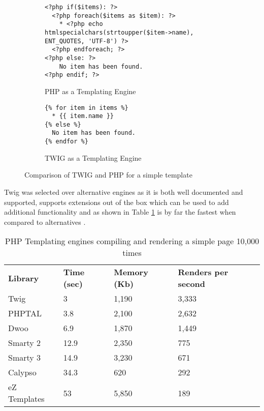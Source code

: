 \begin{figure}
\centering

\begin{subfigure}[a]{\textwidth}
\centering
\begin{lstlisting}[style=phpcolor]
<?php if($items): ?>
  <?php foreach($items as $item): ?>
    * <?php echo htmlspecialchars(strtoupper($item->name), ENT_QUOTES, 'UTF-8') ?>
  <?php endforeach; ?>
<?php else: ?>
    No item has been found.
<?php endif; ?>
\end{lstlisting}
\caption{PHP as a Templating Engine}
\end{subfigure}

\begin{subfigure}[b]{\textwidth}
\centering
\begin{lstlisting}[style=phpcolor,language=twig]
{% for item in items %}
  * {{ item.name }}
{% else %}
  No item has been found.
{% endfor %}
\end{lstlisting}
\caption{TWIG as a Templating Engine}
\end{subfigure}

\caption{Comparison of TWIG and PHP for a simple template}
\label{fig:comparephptwig}
\end{figure}

Twig was selected over alternative engines as it is both well documented and supported, supports extensions out of the box which can be used to add additional functionality and as shown in Table \ref{table:twigbenchmarked} is by far the fastest when compared to alternatives \parencite{potencier2009templating}.

\begin{table}[h]
\begin{tabular}{llll}
\textbf{Library} & \textbf{Time (sec)} & \textbf{Memory (Kb)} & \textbf{Renders per second} \\
Twig             & 3                   & 1,190                & 3,333                                  \\
PHPTAL           & 3.8                 & 2,100                & 2,632                                  \\
Dwoo             & 6.9                 & 1,870                & 1,449                                  \\
Smarty 2         & 12.9                & 2,350                & 775                                    \\
Smarty 3         & 14.9                & 3,230                & 671                                    \\
Calypso          & 34.3                & 620                  & 292                                    \\
eZ Templates     & 53                  & 5,850                & 189                                   
\end{tabular}
\caption[PHP Templating engine benchmarks]{PHP Templating engines compiling and rendering a simple page 10,000 times \parencite{potencier2009templating}}
\label{table:twigbenchmarked}
\end{table}

